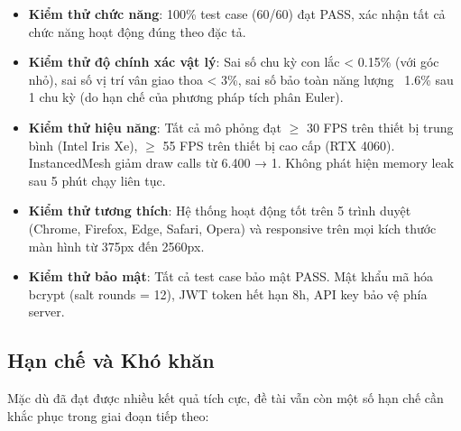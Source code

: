 \begin{itemize}
    \item \textbf{Kiểm thử chức năng}: 100\% test case (60/60) đạt PASS, xác nhận tất cả chức năng hoạt động đúng theo đặc tả.
    
    \item \textbf{Kiểm thử độ chính xác vật lý}: Sai số chu kỳ con lắc < 0.15\% (với góc nhỏ), sai số vị trí vân giao thoa < 3\%, sai số bảo toàn năng lượng ~1.6\% sau 1 chu kỳ (do hạn chế của phương pháp tích phân Euler).
    
    \item \textbf{Kiểm thử hiệu năng}: Tất cả mô phỏng đạt $\geq$ 30 FPS trên thiết bị trung bình (Intel Iris Xe), $\geq$ 55 FPS trên thiết bị cao cấp (RTX 4060). InstancedMesh giảm draw calls từ 6.400 → 1. Không phát hiện memory leak sau 5 phút chạy liên tục.
    
    \item \textbf{Kiểm thử tương thích}: Hệ thống hoạt động tốt trên 5 trình duyệt (Chrome, Firefox, Edge, Safari, Opera) và responsive trên mọi kích thước màn hình từ 375px đến 2560px.
    
    \item \textbf{Kiểm thử bảo mật}: Tất cả test case bảo mật PASS. Mật khẩu mã hóa bcrypt (salt rounds = 12), JWT token hết hạn 8h, API key bảo vệ phía server.
    
\end{itemize}

\subsection{Hạn chế và Khó khăn}

Mặc dù đã đạt được nhiều kết quả tích cực, đề tài vẫn còn một số hạn chế cần khắc phục trong giai đoạn tiếp theo:

